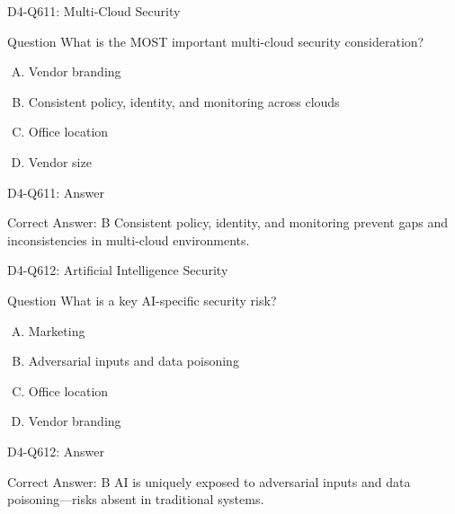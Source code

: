 \documentclass{beamer}
\begin{document}
	\begin{frame}{D4-Q611: Multi-Cloud Security}
		\begin{block}{Question}
			What is the MOST important multi-cloud security consideration?
		\end{block}
		\begin{enumerate}[(A)]
			\item Vendor branding
			\item Consistent policy, identity, and monitoring across clouds
			\item Office location
			\item Vendor size
		\end{enumerate}
	\end{frame}
	\begin{frame}{D4-Q611: Answer}
		\begin{block}{Correct Answer: B}
			Consistent policy, identity, and monitoring prevent gaps and inconsistencies in multi-cloud environments.
		\end{block}
	\end{frame}
	
	\begin{frame}{D4-Q612: Artificial Intelligence Security}
		\begin{block}{Question}
			What is a key AI-specific security risk?
		\end{block}
		\begin{enumerate}[(A)]
			\item Marketing
			\item Adversarial inputs and data poisoning
			\item Office location
			\item Vendor branding
		\end{enumerate}
	\end{frame}
	\begin{frame}{D4-Q612: Answer}
		\begin{block}{Correct Answer: B}
			AI is uniquely exposed to adversarial inputs and data poisoning—risks absent in traditional systems.
		\end{block}
	\end{frame}
	
\end{document}
